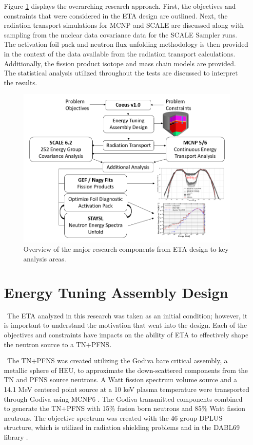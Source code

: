 Figure \ref{fig:ETAFLOW} displays the overarching research approach. 
First, the objectives and constraints that were considered in the ETA design are outlined. Next, the radiation transport simulations for MCNP and SCALE are discussed along with sampling from the nuclear data covariance data for the SCALE Sampler runs. The activation foil pack and neutron flux unfolding methodology is then provided in the context of the data available from the radiation transport calculations. Additionally, the fission product isotope and mass chain models are provided. The statistical analysis utilized throughout the tests are discussed to interpret the results. 

\begin{figure}[ht]
	\includegraphics[width=\linewidth]{Figures/Chapter3/ETA_Flow.png}
	\caption{Overview of the major research components from ETA design to key analysis areas.}
	\label{fig:ETAFLOW}
\end{figure}

\section{Energy Tuning Assembly Design}

\ The ETA analyzed in this research was taken as an initial condition; however, it is important to understand the motivation that went into the design. 
Each of the objectives and constraints have impacts on the ability of ETA to effectively shape the neutron source to a TN+PFNS.  

\ The TN+PFNS was created utilizing the Godiva bare critical assembly, a metallic sphere of HEU, to approximate the down-scattered components from the TN and PFNS source neutrons. 
A Watt fission spectrum volume source and a 14.1 MeV centered point source at a 10 keV plasma temperature were transported through Godiva using MCNP6 \cite{Bevins, MCNP6}. 
The Godiva transmitted components combined to generate the TN+PFNS with 15\% fusion born neutrons and 85\% Watt fission neutrons.  
The objective spectrum was created with the 46 group DPLUS structure, which is utilized in radiation shielding problems and in the DABL69 library \cite{Bevins, ADVANTG}. 

